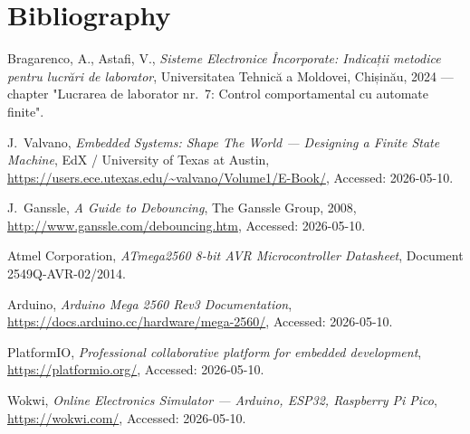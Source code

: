 \section{Bibliography}

\begin{enumerate}[label={[\arabic*]}]
    \item Bragarenco, A., Astafi, V., \textit{Sisteme Electronice Încorporate: Indicații metodice pentru lucrări de laborator}, Universitatea Tehnică a Moldovei, Chișinău, 2024 --- chapter "Lucrarea de laborator nr.~7: Control comportamental cu automate finite".

    \item J.~Valvano, \textit{Embedded Systems: Shape The World --- Designing a Finite State Machine}, EdX / University of Texas at Austin, \url{https://users.ece.utexas.edu/~valvano/Volume1/E-Book/}, Accessed: 2026-05-10.

    \item J.~Ganssle, \textit{A Guide to Debouncing}, The Ganssle Group, 2008, \url{http://www.ganssle.com/debouncing.htm}, Accessed: 2026-05-10.

    \item Atmel Corporation, \textit{ATmega2560 8-bit AVR Microcontroller Datasheet}, Document 2549Q-AVR-02/2014.

    \item Arduino, \textit{Arduino Mega 2560 Rev3 Documentation}, \url{https://docs.arduino.cc/hardware/mega-2560/}, Accessed: 2026-05-10.

    \item PlatformIO, \textit{Professional collaborative platform for embedded development}, \url{https://platformio.org/}, Accessed: 2026-05-10.

    \item Wokwi, \textit{Online Electronics Simulator --- Arduino, ESP32, Raspberry Pi Pico}, \url{https://wokwi.com/}, Accessed: 2026-05-10.
\end{enumerate}
